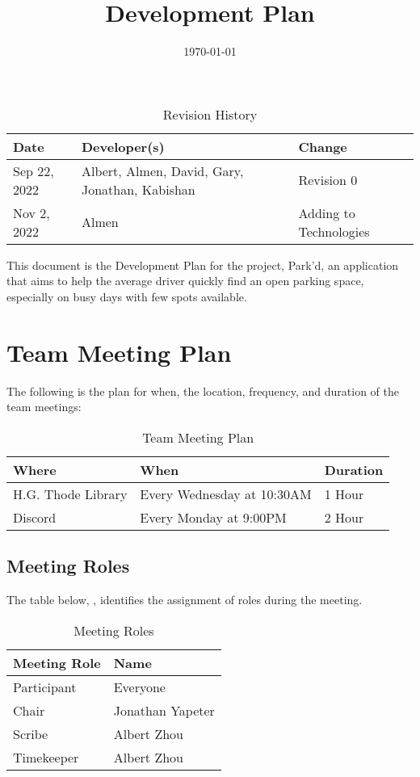 \documentclass[12pt,letterpaper]{article}
\title{Development Plan\\\progname}
\author{\authname}
\date{\today}
\begin{document}
\maketitle

\newpage
\begin{table}[hp]
\caption{Revision History} \label{TblRevisionHistory}
\begin{tabularx}{\textwidth}{p{3cm}p{2.5cm}X}
\toprule
\textbf{Date} & \textbf{Developer(s)} & \textbf{Change}\\
\midrule
Sep 22, 2022 & Albert, Almen, David, Gary, Jonathan, Kabishan & Revision 0\\
\midrule
Nov 2, 2022 & Almen & Adding to Technologies\\
\bottomrule
\end{tabularx}
\end{table}

\newpage
\tableofcontents
\newpage
\listoftables
\newpage

This document is the Development Plan for the project, Park'd, an application
that aims to help the average driver quickly find an open parking space,
especially on busy days with few spots available.

\section{Team Meeting Plan}
\label{TeamMeetingPlan}
The following is the plan for when, the location, frequency, and duration of the
team meetings:
\begin{table}[hp]
\begin{tabularx}{\textwidth}{|l|l|X|}
\toprule
\textbf{Where} & \textbf{When} & \textbf{Duration}\\
\midrule
H.G. Thode Library & Every Wednesday at 10:30AM & 1 Hour\\
Discord & Every Monday at 9:00PM & 2 Hour\\
\bottomrule
\end{tabularx}
\caption{Team Meeting Plan} \label{tab:teamMeetingPlan}
\end{table}

\subsection{Meeting Roles}
\label{meetingRoles}
The table below, , identifies the assignment of roles
during the meeting.
\begin{table}[hp] 
    \centering
    \begin{tabularx}{\textwidth}{|X|X|}
        \toprule
        \textbf{Meeting Role} & \textbf{Name}\\
        \midrule
        Participant & Everyone\\
        Chair & Jonathan Yapeter\\
        Scribe & Albert Zhou\\
        Timekeeper & Albert Zhou\\
        \bottomrule
    \end{tabularx}
\caption{Meeting Roles} 
\label{meetingRolesTable}
\end{table}
\end{document}
